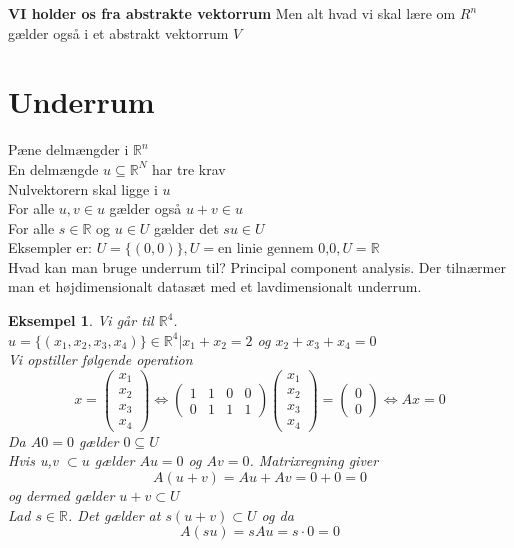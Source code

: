 \documentclass[a4paper,fleqn]{report}
\newcommand{\RR}{\mathbb{R}}
\newtheorem{example}{Eksempel}[chapter]
\begin{document}
	\textbf{VI holder os fra abstrakte vektorrum} Men alt hvad vi skal lære om $R^n$ gælder
	også i et abstrakt vektorrum $V$

	\section{Underrum}
	Pæne delmængder i $\RR^n$\\
	En delmængde $u \subseteq \RR^N $ har tre krav\\
	Nulvektorern skal ligge i $u$\\
	For alle $u,v \in u$ gælder også $u+v \in u$\\
	For alle $s \in \RR$ og $u \in U$ gælder det $su \in U$\\
	Eksempler er:
	$U = \{(0,0)\}, U = \text{en linie gennem 0,0}, U = \RR$ \\

	Hvad kan man bruge underrum til? Principal component analysis. Der tilnærmer man et 
	højdimensionalt datasæt med et lavdimensionalt underrum.\\

	\begin{example}
		Vi går til $\RR^4$.\\
		$u = \{(x_1,x_2,x_3,x_4)\} \in \RR^4 | x_1 + x_2 = 2$ og $x_2 + x_3 + x_4 = 0$\\
		Vi opstiller følgende operation\\
		\[ x = \begin{pmatrix}x_1\\x_2\\x_3\\x_4\end{pmatrix} \Leftrightarrow
			\begin{pmatrix} 1&1&0&0\\0&1&1&1\end{pmatrix}\begin{pmatrix}x_1\\x_2\\x_3\\x_4\end{pmatrix}
		= \begin{pmatrix}0\\0\end{pmatrix} \Leftrightarrow Ax = 0\]
		Da $A0 = 0$ gælder $0 \subseteq U$\\
		Hvis u,v $\subset u$ gælder $Au = 0$ og $Av = 0$. Matrixregning giver
		\[ A(u+v) = Au + Av = 0 + 0 = 0\]
		og dermed gælder $u+v \subset U$\\
		Lad $s \in \RR$. Det gælder at $s(u+v) \subset U$ og da 
		\[ A(su) = sAu = s\cdot0 = 0\]
	\end{example}
\end{document}
